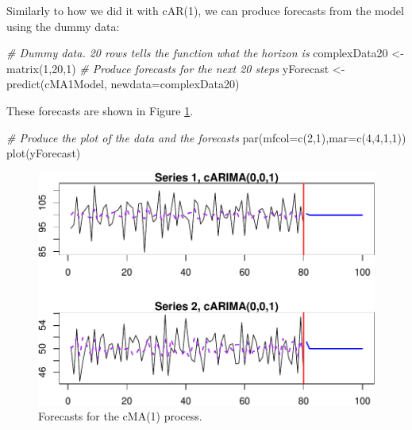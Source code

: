 \documentclass[
]{book}
\newenvironment{Shaded}{\begin{snugshade}}{\end{snugshade}}
\newcommand{\AttributeTok}[1]{\textcolor[rgb]{0.77,0.63,0.00}{#1}}
\newcommand{\CommentTok}[1]{\textcolor[rgb]{0.56,0.35,0.01}{\textit{#1}}}
\newcommand{\DecValTok}[1]{\textcolor[rgb]{0.00,0.00,0.81}{#1}}
\newcommand{\FunctionTok}[1]{\textcolor[rgb]{0.00,0.00,0.00}{#1}}
\newcommand{\NormalTok}[1]{#1}
\newcommand{\OtherTok}[1]{\textcolor[rgb]{0.56,0.35,0.01}{#1}}
\begin{document}
Similarly to how we did it with cAR(1), we can produce forecasts from the model using the dummy data:

\begin{Shaded}
\begin{Highlighting}[]
\CommentTok{\# Dummy data. 20 rows tells the function what the horizon is}
\NormalTok{complexData20 }\OtherTok{\textless{}{-}} \FunctionTok{matrix}\NormalTok{(}\DecValTok{1}\NormalTok{,}\DecValTok{20}\NormalTok{,}\DecValTok{1}\NormalTok{)}
\CommentTok{\# Produce forecasts for the next 20 steps}
\NormalTok{yForecast }\OtherTok{\textless{}{-}} \FunctionTok{predict}\NormalTok{(cMA1Model, }\AttributeTok{newdata=}\NormalTok{complexData20)}
\end{Highlighting}
\end{Shaded}

These forecasts are shown in Figure \ref{fig:complexMA1Forecast}.

\begin{Shaded}
\begin{Highlighting}[]
\CommentTok{\# Produce the plot of the data and the forecasts}
\FunctionTok{par}\NormalTok{(}\AttributeTok{mfcol=}\FunctionTok{c}\NormalTok{(}\DecValTok{2}\NormalTok{,}\DecValTok{1}\NormalTok{),}\AttributeTok{mar=}\FunctionTok{c}\NormalTok{(}\DecValTok{4}\NormalTok{,}\DecValTok{4}\NormalTok{,}\DecValTok{1}\NormalTok{,}\DecValTok{1}\NormalTok{))}
\FunctionTok{plot}\NormalTok{(yForecast)}
\end{Highlighting}
\end{Shaded}

\begin{figure}
\centering
\includegraphics{Svetunkov---Svetunkov---Complex-Valued-Econometrics_files/figure-latex/complexMA1Forecast-1.pdf}
\caption{\label{fig:complexMA1Forecast}Forecasts for the cMA(1) process.}
\end{figure}
\end{document}
